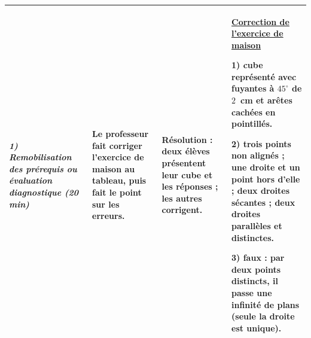 \documentclass[10pt]{article}
\newcommand{\titreR}[1]{\underline{\textcolor{rougetitre}{\bfseries #1}}}
\newcommand{\seance}[1]{\fcolorbox{bleuseance}{bleufond}{\textcolor{bleuseance}{\bfseries #1}}}
\newcommand{\moment}[1]{\textbf{\itshape #1}}
\begin{document}
\begin{longtable}{|p{2.35cm}|p{5.35cm}|p{4.55cm}|p{13.85cm}|}
\hline
\seance{SEANCE 2} \newline \moment{1) Remobilisation des prérequis ou évaluation diagnostique (20 min)} &
Le professeur fait corriger l'exercice de maison au tableau, puis fait le point sur les erreurs. &
\textbf{Résolution} : deux élèves présentent leur cube et les réponses ; les autres corrigent. &
\titreR{Correction de l'exercice de maison} \par
\textbf{1)} cube représenté avec fuyantes à $45^\circ$ de $2$~cm et arêtes cachées en pointillés. \par
\textbf{2)} trois points non alignés ; une droite et un point hors d'elle ; deux droites
sécantes ; deux droites parallèles et distinctes. \par
\textbf{3)} faux : par deux points distincts, il passe une infinité de plans (seule la droite est
unique). \\ \hline


\end{longtable}
\end{document}
